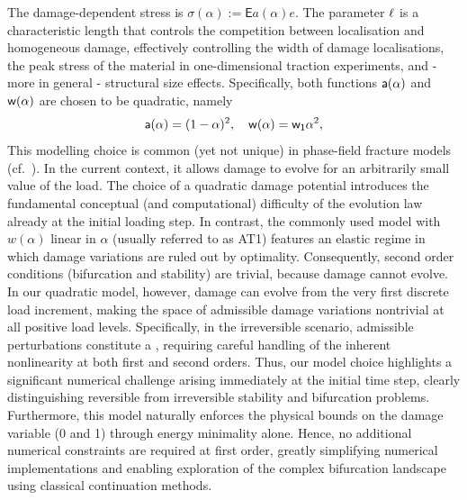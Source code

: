 The damage-dependent stress is $\sigma(\alpha):=\mathsf{E}a(\alpha) e$. The parameter $\ell$ is a characteristic length that controls the competition between localisation and homogeneous damage, effectively controlling the width of damage localisations, the peak stress of the material in one-dimensional traction experiments, and - more in general - structural size effects.
Specifically, both functions $\mathsf{a}(\alpha)$
and $\mathsf{w}(\alpha)$ are chosen to be quadratic, namely
\begin{equation}
    \label{def:constitutive_functions}
    \mathsf{a}(\alpha) = (1-\alpha)^2, \quad \mathsf{w}(\alpha) = \mathsf{w_1}\alpha^2,
\end{equation}
This modelling choice is common (yet not unique) in phase-field fracture models (cf.~\cite{Bourdin2000-pc,Miehe2010-sj,Miehe2010-ja}). In the current context, it allows damage to evolve for an arbitrarily small value of the load. {
        The choice of a quadratic damage potential introduces the fundamental conceptual (and computational) difficulty of the evolution law already at the initial loading step.
        In contrast, the commonly used model with $w(\alpha)$ linear in $\alpha$ (usually referred to as AT1)  features an elastic regime in which damage variations are ruled out by optimality.
        Consequently, second order conditions (bifurcation and stability) are trivial, because damage cannot evolve.
        In our quadratic model, however, damage can evolve from the very first discrete load increment, making the space of admissible damage variations nontrivial at all positive load levels. Specifically, in the irreversible scenario, admissible perturbations constitute a , requiring careful handling of the inherent nonlinearity at both first and second orders. Thus, our model choice highlights a significant numerical challenge arising immediately at the initial time step, clearly distinguishing reversible from irreversible stability and bifurcation problems.
        Furthermore, this model naturally enforces the physical bounds on the damage variable (0 and 1) through energy minimality alone. Hence, no additional numerical constraints are required at first order, greatly simplifying numerical implementations and enabling exploration of the complex bifurcation landscape using classical continuation methods.
    }


